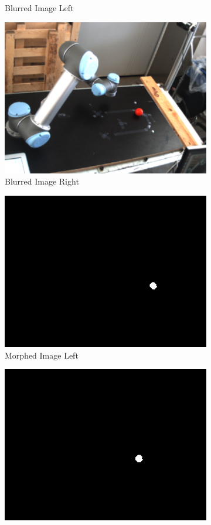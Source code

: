 \begin{figure}[ht!]
\begin{subfigure}{.5\textwidth}
  \caption{Blurred Image Left}
  \label{fig:sfig3}
\end{subfigure}
\begin{subfigure}{.5\textwidth}
  \centering
  \includegraphics[width=.8\linewidth]{Images/blurred_right.png}
  \caption{Blurred Image Right}
  \label{fig:sfig4}
\end{subfigure}
\begin{subfigure}{.5\textwidth}
  \centering
  \includegraphics[width=.8\linewidth]{Images/morphed_left.png}
  \caption{Morphed Image Left}
  \label{fig:sfig5}
\end{subfigure}
\begin{subfigure}{.5\textwidth}
  \centering
  \includegraphics[width=.8\linewidth]{Images/morphed_right.png}

\end{subfigure}
\end{figure}
